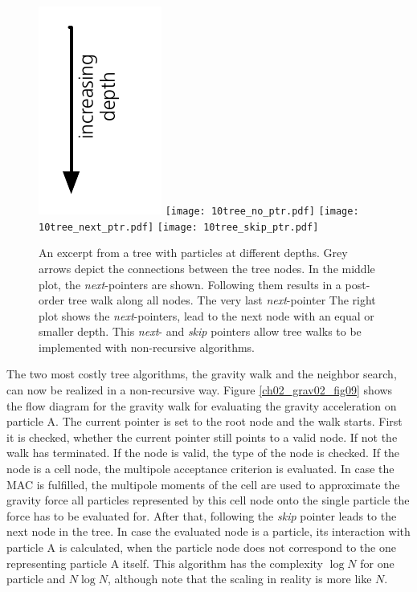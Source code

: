 \begin{figure}
\begin{center}
\includegraphics[scale=0.80]{10tree_depth.pdf}
\texttt{[image: 10tree\_no\_ptr.pdf]}
\texttt{[image: 10tree\_next\_ptr.pdf]}
\texttt{[image: 10tree\_skip\_ptr.pdf]}
\caption{An excerpt from a  tree with particles at different depths. Grey arrows depict the connections between the tree nodes. In the middle plot, the \emph{next}-pointers are shown. Following them results in a post-order tree walk along all nodes. The very last \emph{next}-pointer The right plot shows the \emph{next}-pointers, lead to the next node with an equal or smaller depth. This \emph{next}- and \emph{skip} pointers allow tree walks to be implemented with non-recursive algorithms.}
\label{ch02_grav02_fig08}
\end{center}
\end{figure}

The two most costly tree algorithms, the gravity walk and the neighbor search, can now be realized in a non-recursive way. Figure \ref{ch02_grav02_fig09} shows the flow diagram for the gravity walk for evaluating the gravity acceleration on particle A. The current pointer is set to the root node and the walk starts. First it is checked, whether the current pointer still points to a valid node. If not the walk has terminated. If the node is valid, the type of the node is checked. If the node is a cell node, the multipole acceptance criterion is evaluated. In case the MAC is fulfilled, the multipole moments of the cell are used to approximate the gravity force all particles represented by this cell node onto the single particle the force has to be evaluated for. After that, following the \emph{skip} pointer leads to the next node in the tree. In case the evaluated node is a particle, its interaction with particle A is calculated, when the particle node does not correspond to the one representing particle A itself. This algorithm has the complexity $\log{N}$ for one particle and $N \log{N}$, although \cite{1986Natur.324..446B} note that the scaling in reality is more like $N$.

